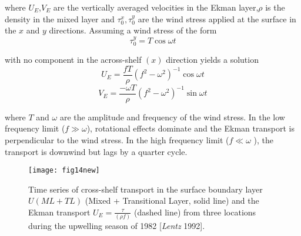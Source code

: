 where $U_{E}$,$V_{E}$ are the vertically averaged velocities in
the Ekman layer,$\rho$ is the density in the mixed layer and
$\tau_{0}^{x},\tau_{0}^{y}$  are the wind stress applied at the
surface in the $x$ and $y$ directions. Assuming a wind stress of
the form
\begin{equation}\label{eq:windstress}
  \tau_{0}^{y}=T\cos \omega t
\end{equation}

with no component in the across-shelf $(x)$ direction yields a
solution
\begin{equation}\label{eq:ekmansolu}
  U_{E}=\frac{fT}{\rho}(f^{2}-\omega ^{2})^{-1}\cos \omega t
\end{equation}
\begin{equation}\label{eq:ekmansolv}
  V_{E}=\frac{-\omega T}{\rho}(f^{2}-\omega ^{2})^{-1}\sin \omega t
\end{equation}

where $T$ and $\omega$  are the amplitude and frequency of the
wind stress. In the low frequency limit ($f\gg \omega $),
rotational effects dominate and the Ekman transport is
perpendicular to the wind stress. In the high frequency limit
($f\ll \omega$ ), the transport is downwind but lags by a quarter
cycle.
\begin{figure}
  \centering
  \texttt{[image: fig14new]}
  \caption{Time series of cross-shelf transport in the surface
  boundary layer $U(ML+TL)$ (Mixed + Transitional Layer, solid line)
  and the Ekman transport $U_E=\frac{\tau}{(\rho f)}$ (dashed line) from three locations
  during the upwelling season of 1982 [{\it Lentz} 1992].}
  \label{fig:ekmanlayer}
\end{figure}

